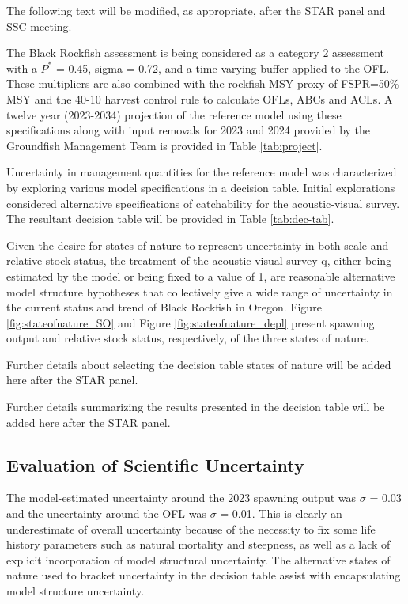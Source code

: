 \documentclass[11pt,
  english,
  letterpaper,
]{article}
\begin{document}
The following text will be modified, as appropriate, after the STAR panel and SSC meeting.

The Black Rockfish assessment is being considered as a category 2 assessment with a \(P^*\) = 0.45, sigma = 0.72, and a time-varying buffer applied to the OFL. These multipliers are also combined with the rockfish MSY proxy of FSPR=50\% MSY and the 40-10 harvest control rule to calculate OFLs, ABCs and ACLs. A twelve year (2023-2034) projection of the reference model using these specifications along with input removals for 2023 and 2024 provided by the Groundfish Management Team is provided in Table \ref{tab:project}.

Uncertainty in management quantities for the reference model was characterized by exploring various model specifications in a decision table. Initial explorations considered alternative specifications of catchability for the acoustic-visual survey. The resultant decision table will be provided in Table \ref{tab:dec-tab}.

Given the desire for states of nature to represent uncertainty in both scale and relative stock status, the treatment of the acoustic visual survey q, either being estimated by the model or being fixed to a value of 1, are reasonable alternative model structure hypotheses that collectively give a wide range of uncertainty in the current status and trend of Black Rockfish in Oregon. Figure \ref{fig:stateofnature_SO} and Figure \ref{fig:stateofnature_depl} present spawning output and relative stock status, respectively, of the three states of nature.

Further details about selecting the decision table states of nature will be added here after the STAR panel.

Further details summarizing the results presented in the decision table will be added here after the STAR panel.

\hypertarget{evaluation-of-scientific-uncertainty}{%
\subsection{Evaluation of Scientific Uncertainty}\label{evaluation-of-scientific-uncertainty}}

The model-estimated uncertainty around the 2023 spawning output was \(\sigma\) = 0.03 and the uncertainty around the OFL was \(\sigma\) = 0.01. This is clearly an underestimate of overall uncertainty because of the necessity to fix some life history parameters such as natural mortality and steepness, as well as a lack of explicit incorporation of model structural uncertainty. The alternative states of nature used to bracket uncertainty in the decision table assist with encapsulating model structure uncertainty.
\end{document}
